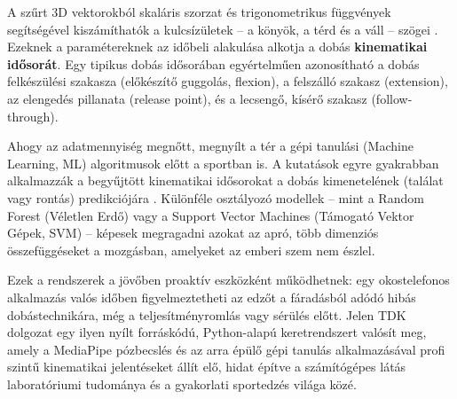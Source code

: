 A szűrt 3D vektorokból skaláris szorzat és trigonometrikus függvények segítségével kiszámíthatók a kulcsízületek – a könyök, a térd és a váll – szögei \cite{Mullineaux2010}. Ezeknek a paramétereknek az időbeli alakulása alkotja a dobás \textbf{kinematikai idősorát}. Egy tipikus dobás idősorában egyértelműen azonosítható a dobás felkészülési szakasza (előkészítő guggolás, flexion), a felszálló szakasz (extension), az elengedés pillanata (release point), és a lecsengő, kísérő szakasz (follow-through).

Ahogy az adatmennyiség megnőtt, megnyílt a tér a gépi tanulási (Machine Learning, ML) algoritmusok előtt a sportban is. A kutatások egyre gyakrabban alkalmazzák a begyűjtött kinematikai idősorokat a dobás kimenetelének (találat vagy rontás) predikciójára \cite{Chen2021}. Különféle osztályozó modellek – mint a Random Forest (Véletlen Erdő) vagy a Support Vector Machines (Támogató Vektor Gépek, SVM) – képesek megragadni azokat az apró, több dimenziós összefüggéseket a mozgásban, amelyeket az emberi szem nem észlel. 

Ezek a rendszerek a jövőben proaktív eszközként működhetnek: egy okostelefonos alkalmazás valós időben figyelmeztetheti az edzőt a fáradásból adódó hibás dobástechnikára, még a teljesítményromlás vagy sérülés előtt. Jelen TDK dolgozat egy ilyen nyílt forráskódú, Python-alapú keretrendszert valósít meg, amely a MediaPipe pózbecslés és az arra épülő gépi tanulás alkalmazásával profi szintű kinematikai jelentéseket állít elő, hidat építve a számítógépes látás laboratóriumi tudománya és a gyakorlati sportedzés világa közé.
